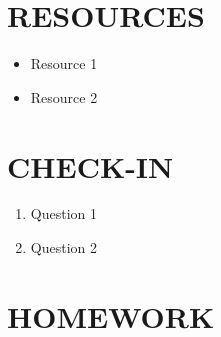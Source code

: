 \documentclass[14pt]{extreport}%
\begin{document}
\section*{RESOURCES}
\begin{itemize}
    \item Resource 1
    \item Resource 2
\end{itemize}

\section*{CHECK-IN}
\begin{enumerate}
    \item Question 1
    \item Question 2
\end{enumerate}

\section*{HOMEWORK}
\end{document}
